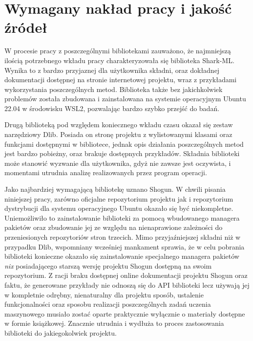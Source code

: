 \section{Wymagany nakład pracy i jakość źródeł}

W procesie pracy z poszczególnymi bibliotekami zauważono, że najmniejszą ilością potrzebnego wkładu pracy charakteryzowała się biblioteka Shark-ML. Wynika to z bardzo przyjaznej dla użytkownika składni, oraz dokładnej dokumentacji dostępnej na stronie internetowej projektu, wraz z przykładami wykorzystania poszczególnych metod. Biblioteka także bez jakichkolwiek problemów została zbudowana i zainstalowana na systemie operacyjnym Ubuntu 22.04 w środowisku WSL2, pozwalając bardzo szybko przejść do badań.

Drugą biblioteką pod względem koniecznego wkładu czasu okazał się zestaw narzędziowy Dlib. Posiada on stronę projektu z wylistowanymi klasami oraz funkcjami dostępnymi w bibliotece, jednak opis działania poszczególnych metod jest bardzo pobieżny, oraz brakuje dostępnych przykładów. Składnia biblioteki może stanowić wyzwanie dla użytkownika, gdyż nie zawsze jest oczywista, i momentami utrudnia analizę realizowanych przez program operacji.

Jako najbardziej wymagającą bibliotekę uznano Shogun. W chwili pisania niniejszej pracy, zarówno oficjalne repozytorium projektu jak i repozytorium dystrybucji dla systemu operacyjnego Ubuntu okazało się być niekompletne. Uniemożliwiło to zainstalowanie biblioteki za pomocą wbudowanego managera pakietów oraz zbudowanie jej ze względu na nienaprawione zależności do przeniesionych repozytoriów stron trzecich. Mimo przyjaźniejszej składni niż w przypadku Dlib, wspomniany wcześniej mankament sprawia, że w celu pobrania biblioteki konieczne okazało się zainstalowanie specjalnego managera pakietów \textit{nix} posiadającego starszą wersję projektu Shogun dostępną na swoim repozytorium. Z racji braku dostępnej online dokumentacji projektu Shogun oraz faktu, że generowane przykłady nie odnoszą się do API biblioteki lecz używają jej w kompletnie odrębny, nienaturalny dla projektu sposób, ustalenie funkcjonalności oraz sposobu realizacji poszczególnych zadań uczenia maszynowego musiało zostać oparte praktycznie wyłącznie o materiały dostępne w formie książkowej. Znacznie utrudnia i wydłuża to proces zastosowania biblioteki do jakiegokolwiek projektu.